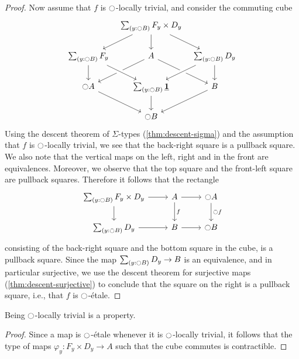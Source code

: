 \documentclass[9pt,twosided]{amsart}
\begin{document}
\begin{proof}
  Now assume that $f$ is ${\ocircle}$-locally trivial, and consider the commuting cube
  \begin{equation*}
    \begin{tikzcd}[column sep=tiny]
      & \sm{y:\modal B}F_y\times D_y \arrow[dl] \arrow[d] \arrow[dr] & \phantom{\modal A} \\
      \sm{y:\modal B}F_y \arrow[d] & A \arrow[dl] \arrow[dr] & \sm{y:\modal B}D_y \arrow[dl,crossing over] \arrow[d] \\
      \modal A \arrow[dr] & \sm{y:\modal B}\unit \arrow[from=ul,crossing over] \arrow[d] & B \arrow[dl] \\
      & \modal B
    \end{tikzcd}
  \end{equation*}
  Using the descent theorem of $\Sigma$-types (\cref{thm:descent-sigma}) and the assumption that $f$ is ${\ocircle}$-locally trivial, we see that the back-right square is a pullback square. We also note that the vertical maps on the left, right and in the front are equivalences. Moreover, we observe that the top square and the front-left square are pullback squares. Therefore it follows that the rectangle 
  \begin{equation*}
    \begin{tikzcd}
      \sm{y:\modal B} F_y\times D_y \arrow[r] \arrow[d] & A \arrow[d,"f"] \arrow[r] & \modal A \arrow[d,"\modal f"] \\
      \sm{y:\modal B}D_y \arrow[r] & B \arrow[r] & \modal B 
    \end{tikzcd}
  \end{equation*}
  consisting of the back-right square and the bottom square in the cube, is a pullback square. Since the map $\sm{y:\modal B}D_y\to B$ is an equivalence, and in particular surjective, we use the descent theorem for surjective maps (\cref{thm:descent-surjective}) to conclude that the square on the right is a pullback square, i.e., that $f$ is ${\ocircle}$-\'etale.
\end{proof}

\begin{cor}
  Being ${\ocircle}$-locally trivial is a property.
\end{cor}

\begin{proof}
  Since a map is ${\ocircle}$-\'etale whenever it is ${\ocircle}$-locally trivial, it follows that the type of maps $\varphi_y:F_y\times D_y\to A$ such that the cube commutes is contractible.
\end{proof}
\end{document}
